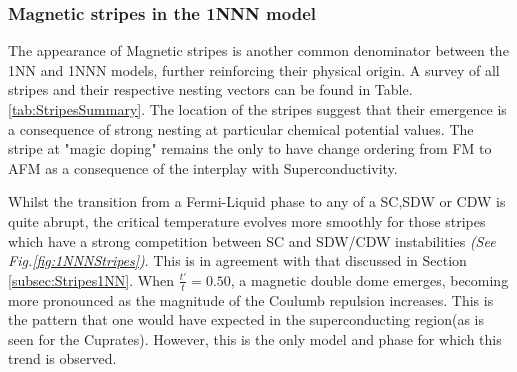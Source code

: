 \documentclass[12pt]{article}
\begin{document}
\newpage

\subsubsection{Magnetic stripes in the 1NNN model}
\label{subsec:Stripes1NNN}

The appearance of Magnetic stripes is another common denominator between the 1NN and 1NNN models, further reinforcing their physical origin.
A survey of all stripes and their respective nesting vectors can be found in Table.\ref{tab:StripesSummary}. The location of the
stripes suggest that their emergence is a consequence of strong nesting at particular chemical potential values. 
The stripe at "magic doping" remains the only to have change ordering from FM to AFM as a consequence of the interplay with Superconductivity. 



\medskip 

\noindent Whilst the transition from a Fermi-Liquid phase to any of a SC,SDW or CDW is quite abrupt, the critical temperature
evolves more smoothly for those stripes which have a strong competition between SC and SDW/CDW instabilities \textit{(See Fig.\ref{fig:1NNNStripes})}. This is in agreement with
that discussed in Section \ref{subsec:Stripes1NN}. When $\frac{t'}{t} = 0.50$, a magnetic double dome emerges, becoming more pronounced as the 
magnitude of the Coulumb repulsion increases. This is the pattern that one would have expected in
the superconducting region(as is seen for the Cuprates\cite{taillefer2010scattering}). However, this is the only 
model and phase for which this trend is observed. 
 
\end{document}
